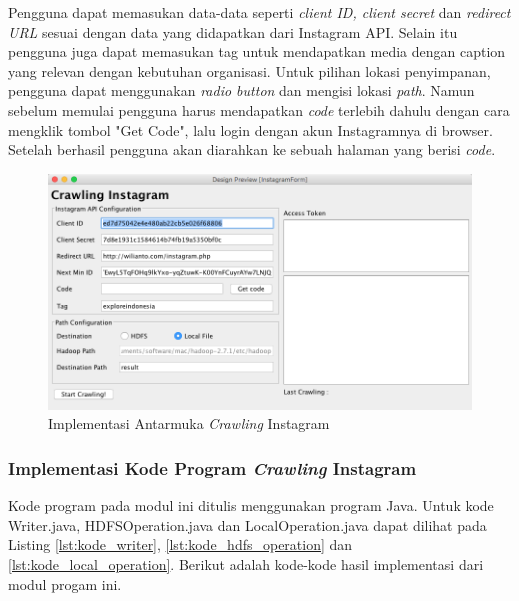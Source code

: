 Pengguna dapat memasukan data-data seperti \textit{client ID, client secret} dan \textit{redirect URL} sesuai dengan data yang didapatkan dari Instagram API. Selain itu pengguna juga dapat memasukan tag untuk mendapatkan media dengan caption yang relevan dengan kebutuhan organisasi. Untuk pilihan lokasi penyimpanan, pengguna dapat menggunakan \textit{radio button} dan mengisi lokasi \textit{path}. Namun sebelum memulai pengguna harus mendapatkan \textit{code} terlebih dahulu dengan cara mengklik tombol "Get Code", lalu login dengan akun Instagramnya di browser. Setelah berhasil pengguna akan diarahkan ke sebuah halaman yang berisi \textit{code}.

\begin{figure}[H]
	\centering
	\includegraphics[scale=0.5]{Gambar/ui-implementasi-crawling-instagram.png}
	\caption[Implementasi Antarmuka \textit{Crawling} Instagram]{Implementasi Antarmuka \textit{Crawling} Instagram} 
	\label{fig:ui_implementasi_streaming_instagram}
\end{figure}

\subsubsection{Implementasi Kode Program \textit{Crawling} Instagram}
Kode program pada modul ini ditulis menggunakan program Java. Untuk kode Writer.java, HDFSOperation.java dan LocalOperation.java dapat dilihat pada Listing \ref{lst:kode_writer}, \ref{lst:kode_hdfs_operation} dan \ref{lst:kode_local_operation}. Berikut adalah kode-kode hasil implementasi dari modul progam ini. 

